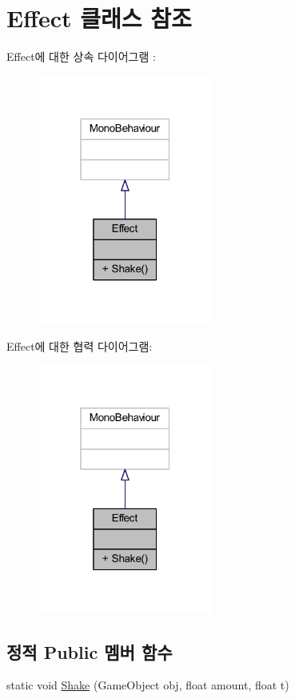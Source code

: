 \hypertarget{class_effect}{}\section{Effect 클래스 참조}
\label{class_effect}


Effect에 대한 상속 다이어그램 \+: \nopagebreak
\begin{figure}[H]
\begin{center}
\leavevmode
\includegraphics[width=163pt]{d2/ddc/class_effect__inherit__graph}
\end{center}
\end{figure}


Effect에 대한 협력 다이어그램\+:\nopagebreak
\begin{figure}[H]
\begin{center}
\leavevmode
\includegraphics[width=163pt]{d8/d69/class_effect__coll__graph}
\end{center}
\end{figure}
\subsection*{정적 Public 멤버 함수}
\begin{DoxyCompactItemize}
\item 
static void \mbox{\hyperlink{class_effect_ab616e21d42dd2721ea79471c9c8026b4}{Shake}} (Game\+Object obj, float amount, float t)
\end{DoxyCompactItemize}


